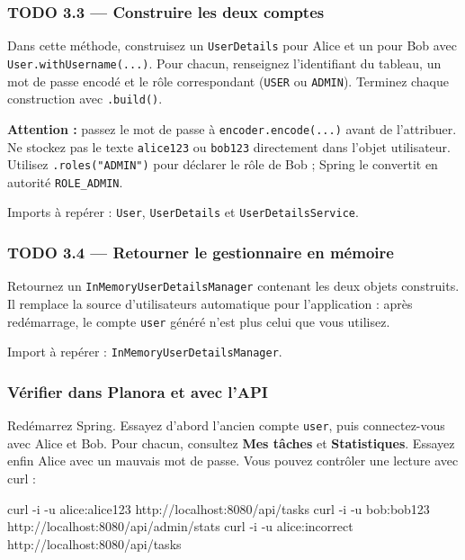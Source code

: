 \documentclass[
  french,
  10pt,
  a4paper,
]{article}
\newenvironment{Shaded}{}{}
\newcommand{\AttributeTok}[1]{\textcolor[rgb]{0.49,0.56,0.16}{#1}}
\newcommand{\ExtensionTok}[1]{#1}
\newcommand{\NormalTok}[1]{#1}
\begin{document}
\subsubsection{TODO 3.3 --- Construire les deux
comptes}\label{todo-3.3-construire-les-deux-comptes}

Dans cette méthode, construisez un \texttt{UserDetails} pour Alice et un
pour Bob avec \texttt{User.withUsername(...)}. Pour chacun, renseignez
l'identifiant du tableau, un mot de passe encodé et le rôle
correspondant (\texttt{USER} ou \texttt{ADMIN}). Terminez chaque
construction avec \texttt{.build()}.

\textbf{Attention :} passez le mot de passe à
\texttt{encoder.encode(...)} avant de l'attribuer. Ne stockez pas le
texte \texttt{alice123} ou \texttt{bob123} directement dans l'objet
utilisateur. Utilisez \texttt{.roles("ADMIN")} pour déclarer le rôle de
Bob ; Spring le convertit en autorité \texttt{ROLE\_ADMIN}.

Imports à repérer : \texttt{User}, \texttt{UserDetails} et
\texttt{UserDetailsService}.

\subsubsection{TODO 3.4 --- Retourner le gestionnaire en
mémoire}\label{todo-3.4-retourner-le-gestionnaire-en-muxe9moire}

Retournez un \texttt{InMemoryUserDetailsManager} contenant les deux
objets construits. Il remplace la source d'utilisateurs automatique pour
l'application : après redémarrage, le compte \texttt{user} généré n'est
plus celui que vous utilisez.

Import à repérer : \texttt{InMemoryUserDetailsManager}.

\subsubsection{Vérifier dans Planora et avec
l'API}\label{vuxe9rifier-dans-planora-et-avec-lapi}

Redémarrez Spring. Essayez d'abord l'ancien compte \texttt{user}, puis
connectez-vous avec Alice et Bob. Pour chacun, consultez \textbf{Mes
tâches} et \textbf{Statistiques}. Essayez enfin Alice avec un mauvais
mot de passe. Vous pouvez contrôler une lecture avec curl :

\begin{Shaded}
\begin{Highlighting}[]
\ExtensionTok{curl} \AttributeTok{{-}i} \AttributeTok{{-}u}\NormalTok{ alice:alice123 http://localhost:8080/api/tasks}
\ExtensionTok{curl} \AttributeTok{{-}i} \AttributeTok{{-}u}\NormalTok{ bob:bob123 http://localhost:8080/api/admin/stats}
\ExtensionTok{curl} \AttributeTok{{-}i} \AttributeTok{{-}u}\NormalTok{ alice:incorrect http://localhost:8080/api/tasks}
\end{Highlighting}
\end{Shaded}
\end{document}

